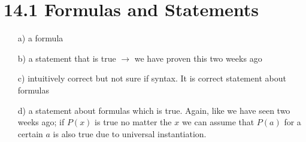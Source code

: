 \documentclass[12pt]{article}
\title{\titleVar}
\date{\today}
\author{\authorVar}
\newcommand{\tocr}{
\renewcommand\cftaftertoctitle{\par\noindent\hrulefill\par\vskip-0.65em}
\tableofcontents
\noindent\hrulefill
}
\begin{document}
\maketitle
\thispagestyle{fancy}

\section*{14.1 Formulas and Statements}
\begin{enumerate}
    \item[a)] a formula
    \item[b)] a statement that is true $\rightarrow$ we have proven this two weeks ago
    \item[c)] intuitively correct but not sure if syntax. It is correct statement about formulas
    \item[d)] a statement about formulas which is true. Again, like we have seen two weeks ago; if $P(x)$ is true no matter the $x$ we can assume that $P(a)$ for a certain $a$ is also true due to universal instantiation.
\end{enumerate}
\end{document}
